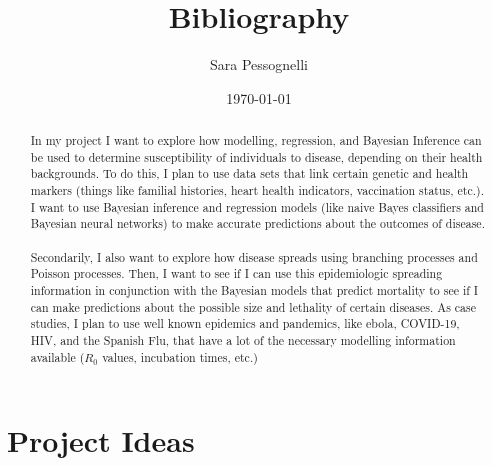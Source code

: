 \documentclass[11pt]{article}
\title{Bibliography}
\author{Sara Pessognelli}
\date{\today}
\begin{document}
\maketitle
\section*{Project Ideas}
\begin{abstract}
    In my project I want to explore how modelling, regression, and Bayesian Inference can be used to determine susceptibility of individuals to disease, depending on their health backgrounds. To do this, I plan to use
    data sets that link certain genetic and health markers (things like familial histories, heart health indicators, vaccination status, etc.). I want to use Bayesian inference and regression models (like naive Bayes classifiers and 
    Bayesian neural networks) to make accurate predictions about the outcomes of disease.\\\\
    Secondarily, I also want to explore how disease spreads using branching processes and Poisson processes. Then, I want to see if I can use this epidemiologic spreading information in conjunction with the Bayesian models that predict mortality
    to see if I can make predictions about the possible size and lethality of certain diseases. As case studies, I plan to use well known epidemics and pandemics, like ebola, COVID-19, HIV, and the Spanish Flu, that have a lot of the necessary modelling information
    available ($R_0$ values, incubation times, etc.)
\end{abstract}
\end{document}
